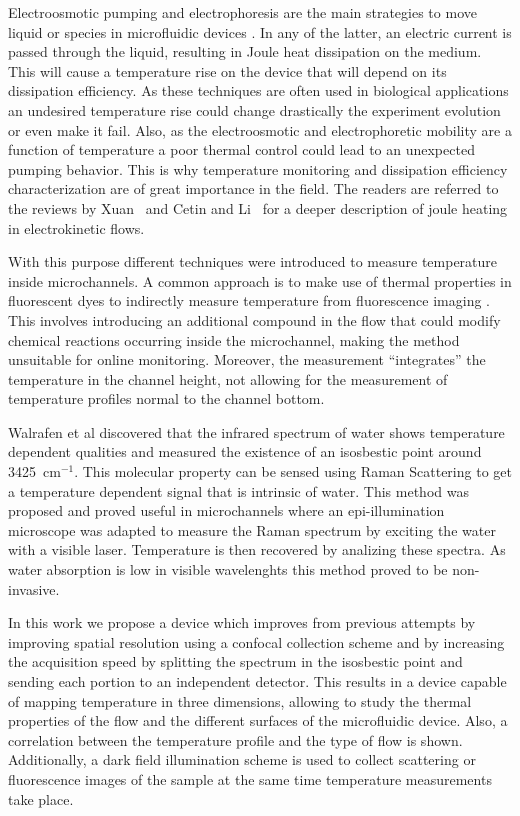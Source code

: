 \documentclass[]{spie}  %
\begin{document}
Electroosmotic pumping and electrophoresis are the main strategies to move liquid or species in microfluidic devices  \cite{hunter2001,lyklema1995}. In any of the latter, an electric current is passed through the liquid, resulting in Joule heat dissipation on the medium. This will cause a temperature rise on the device that will depend on its dissipation efficiency. As these techniques are often used in biological applications \cite{tian2008} an undesired temperature rise could change drastically the experiment evolution or even make it fail. Also, as the electroosmotic and electrophoretic mobility are a function of temperature \cite{tang2006} a poor thermal control could lead to an unexpected pumping behavior. This is why temperature monitoring and dissipation efficiency characterization are of great importance in the field. The readers are referred to the reviews by Xuan~\cite{xuan2008} and Cetin and Li~\cite{cetin2008} for a deeper description of joule heating in electrokinetic flows. 

With this purpose different techniques were introduced to measure temperature inside microchannels. A common approach is to make use of thermal properties in fluorescent dyes to indirectly measure temperature from fluorescence imaging \cite{tang2006,ross2001,erickson2003,dye1,dye2}. This involves introducing an additional compound in the flow that could modify chemical reactions occurring inside the microchannel, making the method unsuitable for online monitoring. Moreover, the measurement ``integrates'' the temperature in the channel height, not allowing for the measurement of temperature profiles normal to the channel bottom. 

Walrafen et al \cite{walrafen1} discovered that the infrared spectrum of water shows temperature dependent qualities and measured the existence of an isosbestic point around 3425~$\mathrm{cm^{-1}}$. This molecular property can be sensed using Raman Scattering to get a temperature dependent signal that is intrinsic of water. This method was proposed and proved useful in microchannels \cite{raman1,raman2,raman3} where an epi-illumination microscope was adapted to measure the Raman spectrum by exciting the water with a visible laser. Temperature is then recovered by analizing these spectra. As water absorption is low in visible wavelenghts \cite{absorption} this method proved to be non-invasive.

In this work we propose a device which improves from previous attempts by improving spatial resolution using a confocal collection scheme and by increasing the acquisition speed by splitting the spectrum in the isosbestic point and sending each portion to an independent detector. This results in a device capable of mapping temperature in three dimensions, allowing to study the thermal properties of the flow and the different surfaces of the microfluidic device. Also, a correlation between the temperature profile and the type of flow is shown. Additionally, a dark field illumination scheme is used to collect scattering or fluorescence images of the sample at the same time temperature measurements take place.
\end{document}
